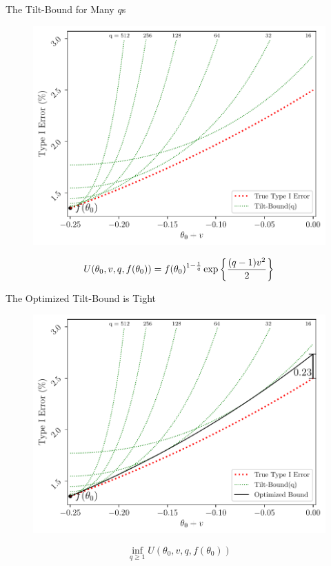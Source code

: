 \begin{frame}{The Tilt-Bound for Many $q$s}
\begin{figure}
    \centering
    \includegraphics[width=0.85\linewidth]{figs/greens_up_all_q.pdf}
\end{figure} 
\begin{equation*}
    U(\theta_0, v, q, f(\theta_0))
    =
    f(\theta_0)^{1 - \frac{1}{q}} 
    \exp\left\{\frac{(q - 1) v^2}{2}\right\}
\end{equation*}
\end{frame}

\begin{frame}{The Optimized Tilt-Bound is Tight}
\begin{figure}
    \centering
    \includegraphics[width=0.85\linewidth]{figs/greens_up.pdf}
\end{figure} 
\begin{equation*}
 \inf\limits_{q \geq 1} U(\theta_0, v, q, f(\theta_0))
\end{equation*}
\end{frame}

